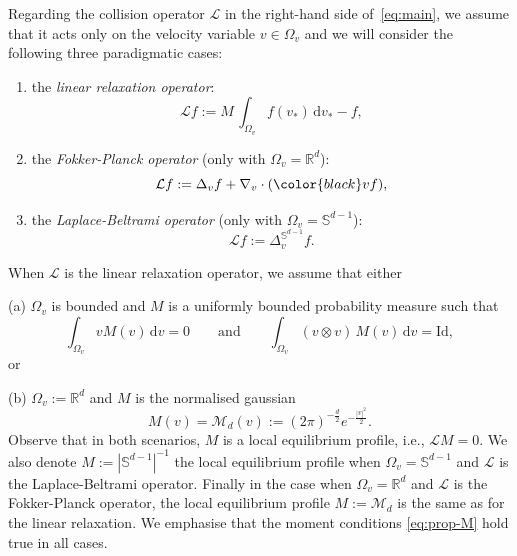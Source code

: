 \documentclass[11pt]{amsart}
\theoremstyle{definition}
\theoremstyle{remark}
\numberwithin{equation}{section}
\newcommand\R{{\mathbb R}}
\def\LL{{\mathcal L}}
\def\MMM{{\mathscr M}}
\newcommand{\dd}{{\, \mathrm d}}
\newcommand{\Blue}{\color{black}}
\begin{document}
\smallskip
Regarding the collision operator $\LL$ in the right-hand side of~\eqref{eq:main}, we assume that it acts only on the velocity variable $v \in \Omega_v$ and {\Blue we} will consider the following three paradigmatic cases:
\begin{enumerate}
\item the \textit{linear relaxation operator}:
  \begin{equation*}
    \mathcal Lf := M \, \int_{\Omega_v} f(v_*) \dd v_* - f,
  \end{equation*}

\item the \textit{Fokker-Planck operator} (only with $\Omega_v = \R^d$):
  \begin{equation*}
    \mathcal Lf := \Delta_v f + \nabla_v \cdot ( {\Blue v f}),
  \end{equation*}

\item the \textit{Laplace-Beltrami operator} (only with  $\Omega_v = \mathbb{S}^{d-1}$):
  \begin{equation*}
    \mathcal Lf := \Delta^{\mathbb{S}^{d-1}}_v f.
  \end{equation*}
\end{enumerate}
When $\mathcal{L}$ is the linear relaxation operator, we assume that either 

\medskip

(a) $\Omega_v$ is bounded and $M$ is a uniformly bounded probability measure such that
\begin{equation}
  \label{eq:prop-M}
  \int_{\Omega_v} v M(v)  \dd v =0 \qquad \text{and} \qquad 
  \int_{\Omega_v} (v \otimes v) \, M(v)  \dd v = \text{Id},
\end{equation}
or 

(b) $\Omega_v := \R^d$ and $M$ is the normalised gaussian
\begin{equation*}
  M(v) = \MMM_{d}(v) := (2\pi)^{-\frac{d}{2}} e^{-\frac{|v|^2}2}.
\end{equation*}
Observe that in both scenarios, $M$ is a local equilibrium profile, i.e., $\LL M = 0$. We also denote $M :=|\mathbb{S}^{d-1}|^{-1}$ the local equilibrium profile when $\Omega_v = \mathbb{S}^{d-1}$ and $\mathcal{L}$ is the Laplace-Beltrami operator. Finally in the case when $\Omega_v = \R^d$ and $\mathcal{L}$ is the Fokker-Planck operator, the local equilibrium profile $M:= \MMM_d$ is the same as for the linear relaxation. We emphasise that the moment conditions \eqref{eq:prop-M} hold true in all cases. 
\end{document}
